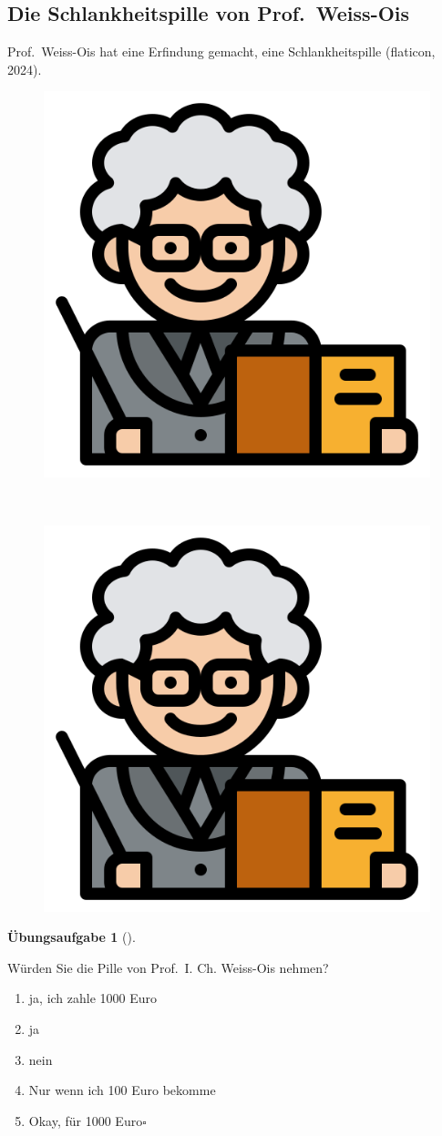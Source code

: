 \documentclass[
  letterpaper,
  oneside,
  open=any]{scrbook}
\providecommand{\tightlist}{%
  \setlength{\itemsep}{0pt}\setlength{\parskip}{0pt}}\usepackage{longtable,booktabs,array}
\theoremstyle{definition}
\newtheorem{exercise}{Übungsaufgabe}[chapter]
\theoremstyle{definition}
\theoremstyle{definition}
\theoremstyle{remark}
\begin{document}
\subsection{Die Schlankheitspille von
Prof.~Weiss-Ois}\label{sec-weiss-ois}

Prof.~Weiss-Ois hat eine Erfindung gemacht, eine Schlankheitspille
(flaticon, 2024).

\begin{figure}

\begin{minipage}{0.46\linewidth}

\includegraphics[width=0.25\linewidth,height=\textheight,keepaspectratio]{img/teacher.png}

\end{minipage}%
%
\begin{minipage}{0.09\linewidth}
~\end{minipage}%
%
\begin{minipage}{0.46\linewidth}

\includegraphics[width=0.25\linewidth,height=\textheight,keepaspectratio]{img/teacher.png}

\end{minipage}%

\end{figure}%

\begin{exercise}[]\protect\hypertarget{exr-weisoiss2}{}\label{exr-weisoiss2}

Würden Sie die Pille von Prof.~I. Ch. Weiss-Ois nehmen?

\begin{enumerate}
\def\labelenumi{\alph{enumi})}
\tightlist
\item
  ja, ich zahle 1000 Euro
\item
  ja
\item
  nein
\item
  Nur wenn ich 100 Euro bekomme
\item
  Okay, für 1000 Euro\(\square\)
\end{enumerate}

\end{exercise}
\end{document}
